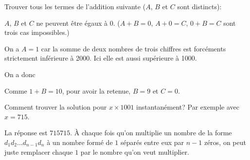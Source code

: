 \documentclass[fleqn,a4paper,nobib]{tufte-handout}
\begin{document}
\begin{exercise}
    Trouver tous les termes de l'addition suivante
    ($A$, $B$ et $C$ sont distincts):

\end{exercise}

\begin{solution}
    $A$, $B$ et $C$ ne peuvent être égaux à $0$.
    ($A + B = 0$, $A + 0 = C$, $0 + B = C$ sont
    trois cas impossibles.)

    On a $A = 1$ car la somme de deux nombres de trois chiffres
    est forcéments strictement inférieure à 2000. Ici elle est
    aussi supérieure à 1000.

    On a donc



    Comme $1 + B = 10$, pour avoir la retenue, $B = 9$ et $C = 0$.

\end{solution}







\begin{exercise}
    Comment trouver la solution pour \(x \times 1001\)
    instantanément? Par exemple avec \(x = 715\).
\end{exercise}

\begin{solution}
    La réponse est $715715$. À chaque fois qu'on multiplie
    un nombre de la forme $d_1d_2\dots d_{n-1}d_n$ à
    un nombre formé de $1$ séparés entre eux par $n-1$ zéros,
    on peut juste remplacer chaque $1$ par le nombre qu'on
    veut multiplier.
\end{solution}
\end{document}
